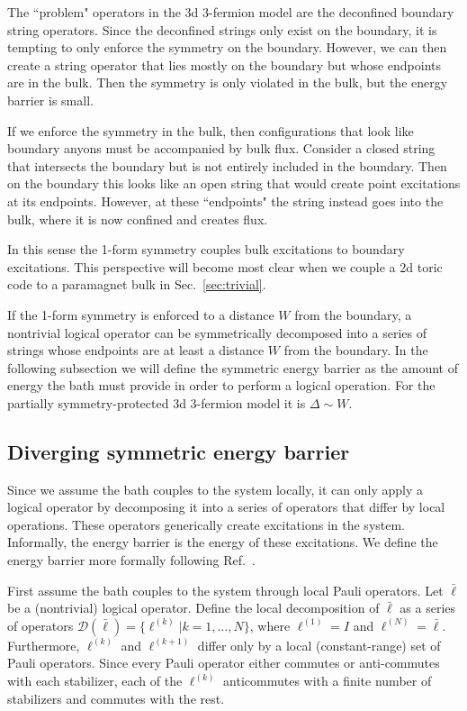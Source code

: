 \documentclass[twocolumn, longbibliography]{revtex4-2}
\renewcommand{\l}{\ell}
\begin{document}
The ``problem" operators in the 3d 3-fermion model are the deconfined boundary string operators. 
Since the deconfined strings only exist on the boundary, it is tempting to only enforce the symmetry on the boundary. However, we can then create a string operator that lies mostly on the boundary but whose endpoints are in the bulk. Then the symmetry is only violated in the bulk, but the energy barrier is small.

If we enforce the symmetry in the bulk, then configurations that look like boundary anyons must be accompanied by bulk flux. Consider a closed string that intersects the boundary but is not entirely included in the boundary. Then on the boundary this looks like an open string that would create point excitations at its endpoints. However, at these   ``endpoints" the string instead goes into the bulk, where it is now confined and creates flux.

In this sense the 1-form symmetry couples bulk excitations to boundary excitations. This perspective will become most clear when we couple a 2d toric code to a paramagnet bulk in Sec.~\ref{sec:trivial}.

If the 1-form symmetry is enforced to a distance $W$ from the boundary, a nontrivial logical operator can be symmetrically decomposed into a series of strings whose endpoints are at least a distance $W$ from the boundary. 
In the following subsection we will define the symmetric energy barrier as the amount of energy the bath must provide in order to perform a logical operation. For the partially symmetry-protected 3d 3-fermion model it is $\Delta\sim W$.

\subsection{Diverging symmetric energy barrier} \label{sub:ener}

Since we assume the bath couples to the system locally, it can only apply a logical operator by decomposing it into a series of operators that differ by local operations. These operators generically create excitations in the system. Informally, the energy barrier is the energy of these excitations. We define the energy barrier more formally following Ref.~\cite{RobertsBartlett}.

First assume the bath couples to the system through local Pauli operators. Let $\bar{\l}$ be a (nontrivial) logical operator. Define the local decomposition of $\bar{\l}$ as a series of operators $\mathcal{D}(\bar{\l}) = \{\l^{(k)}| k = 1,\dots,N\}$, where $\l^{(1)}=I$ and $\l^{(N)}=\bar{\l}$. Furthermore, $\l^{(k)}$ and $\l^{(k+1)}$ differ only by a local (constant-range) set of Pauli operators. Since every Pauli operator either commutes or anti-commutes with each stabilizer, each of the $\l^{(k)}$ anticommutes with a finite number of stabilizers and commutes with the rest.
\end{document}
